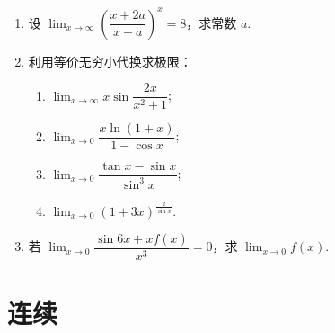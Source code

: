 \begin{enumerate}
    \item 设 $\displaystyle\lim_{x\to\infty}\left(\dfrac{x+2a}{x-a}\right)^x=8$，求常数 $a$.
    
    \item 利用等价无穷小代换求极限：
    \begin{enumerate}[(1)]\setlength{\itemsep}{5pt}\setlength{\topsep}{15pt}
        \item $\displaystyle\lim_{x\to\infty}x\sin\dfrac{2x}{x^2+1}$;
        \item $\displaystyle\lim_{x\to0}\dfrac{x\ln(1+x)}{1-\cos x}$;
        \item $\displaystyle\lim_{x\to0}\dfrac{\tan x-\sin x}{\sin^3x}$;
        \item $\displaystyle\lim_{x\to0}(1+3x)^{\frac{2}{\sin x}}$.
    \end{enumerate}

    \item 若 $\displaystyle\lim_{x\to0}\dfrac{\sin 6x+xf(x)}{x^3}=0$，求 $\displaystyle\lim_{x\to 0}f(x)$.

\end{enumerate}


\section{连续}

